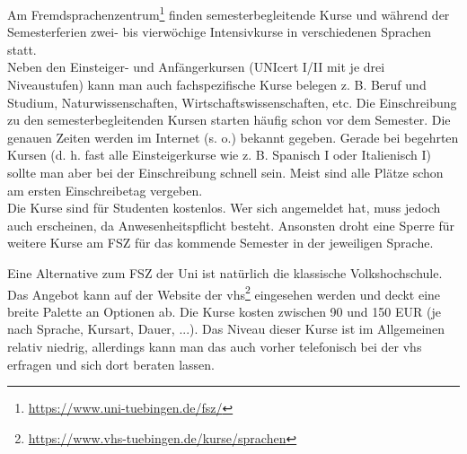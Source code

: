 Am Fremdsprachenzentrum\footnote{\url{https://www.uni-tuebingen.de/fsz/}} finden semesterbegleitende Kurse und während der Semesterferien zwei- bis vierwöchige Intensivkurse in verschiedenen Sprachen statt.\\
Neben den Einsteiger- und Anfängerkursen (UNIcert I/II mit je drei Niveaustufen) kann man auch fachspezifische Kurse belegen z. B. Beruf und Studium, Naturwissenschaften, Wirtschaftswissenschaften, etc.  
Die Einschreibung zu den semesterbegleitenden Kursen starten häufig schon vor dem Semester. Die genauen Zeiten werden im Internet (s. o.) bekannt gegeben.  Gerade bei begehrten Kursen (d. h. fast alle Einsteigerkurse wie z. B. Spanisch I oder Italienisch I) sollte man aber bei der  Einschreibung schnell sein. Meist sind alle Plätze schon am ersten Einschreibetag vergeben.\\
Die Kurse sind für Studenten kostenlos. Wer sich angemeldet hat, muss jedoch auch erscheinen, da Anwesenheitspflicht besteht. Ansonsten droht eine Sperre für weitere Kurse am FSZ für das kommende Semester in der jeweiligen Sprache.
  
Eine Alternative zum FSZ der Uni ist natürlich die klassische Volkshochschule. Das Angebot kann auf der Website der vhs\footnote{\url{https://www.vhs-tuebingen.de/kurse/sprachen}} eingesehen werden und deckt eine breite Palette an Optionen ab. 
Die Kurse kosten zwischen 90 und 150 EUR (je nach Sprache, Kursart, Dauer, ...). Das Niveau dieser Kurse ist im Allgemeinen relativ niedrig, allerdings kann man das auch vorher telefonisch bei der vhs erfragen und sich dort beraten lassen.

